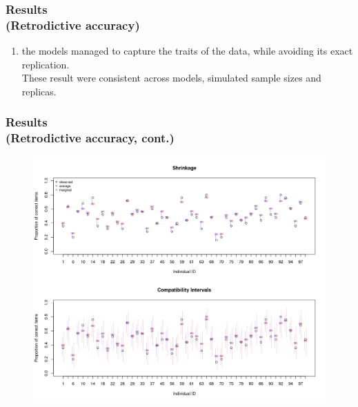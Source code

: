 \documentclass[arial,12pt,xcolor=dvipsnames]{beamer}
\begin{document}
%
\begin{frame}
	\frametitle{Results \\
		(Retrodictive accuracy)}
	\begin{enumerate}
		\item the models managed to capture the traits of the data, while avoiding its exact replication.\\
		\vspace{0.3cm} These result were consistent across models, simulated sample sizes and replicas.
	\end{enumerate} 
\end{frame}
%
\begin{frame}
	\frametitle{Results \\
		(Retrodictive accuracy, cont.)}
	\begin{figure}[H]
		\centering
		\includegraphics[width=0.85\linewidth]{FOLV_NC_J100_Ndata4_HitRate_ind}
		\label{fig:FOLV_NC_hitrate_ind}
	\end{figure} 
\end{frame}
%
%
\end{document}
